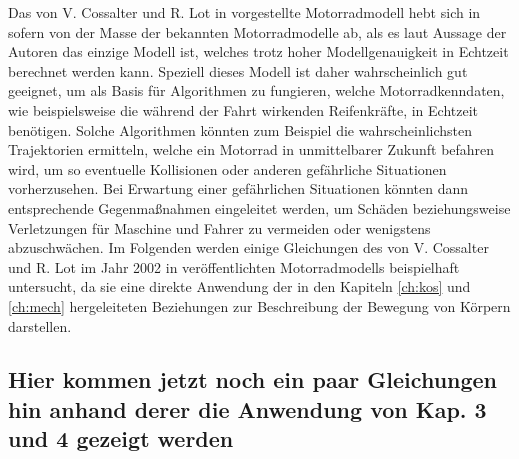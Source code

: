 Das von V. Cossalter und R. Lot in \cite{Cossalter2002} vorgestellte Motorradmodell hebt sich in sofern von der Masse der bekannten Motorradmodelle ab, als es laut Aussage der Autoren das einzige Modell ist, welches trotz hoher Modellgenauigkeit in Echtzeit berechnet werden kann. Speziell dieses Modell ist daher wahrscheinlich gut geeignet, um als Basis f\"ur Algorithmen zu fungieren, welche Motorradkenndaten, wie beispielsweise die w\"ahrend der Fahrt wirkenden Reifenkr\"afte, in Echtzeit ben\"otigen. Solche Algorithmen k\"onnten zum Beispiel die wahrscheinlichsten Trajektorien ermitteln, welche ein Motorrad in unmittelbarer Zukunft befahren wird, um so eventuelle Kollisionen oder anderen gef\"ahrliche Situationen vorherzusehen. Bei Erwartung einer gef\"ahrlichen Situationen k\"onnten dann entsprechende Gegenma\ss{}nahmen eingeleitet werden, um Sch\"aden beziehungsweise Verletzungen f\"ur Maschine und Fahrer zu vermeiden oder wenigstens abzuschw\"achen. \hfill \newline
Im Folgenden werden einige Gleichungen des von V. Cossalter und R. Lot im Jahr 2002 in \cite{Cossalter2002} ver\"offentlichten Motorradmodells beispielhaft untersucht, da sie eine direkte Anwendung der in den Kapiteln \ref{ch:kos} und \ref{ch:mech} hergeleiteten Beziehungen zur Beschreibung der Bewegung von K\"orpern darstellen. 

\subsection{Hier kommen jetzt noch ein paar Gleichungen hin anhand derer die Anwendung von Kap. 3 und 4 gezeigt werden}